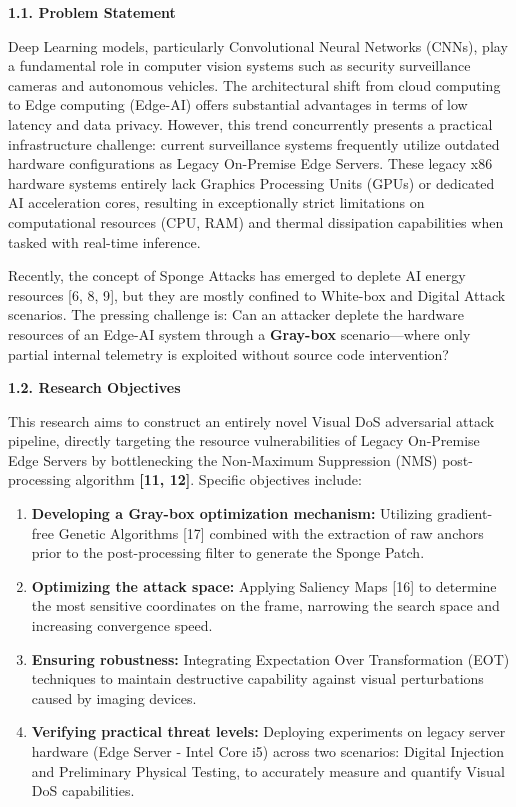 \documentclass[]{article}
\begin{document}
\textbf{1.1. Problem Statement}

Deep Learning models, particularly Convolutional Neural Networks (CNNs), play a fundamental role in computer vision systems such as security surveillance cameras and autonomous vehicles. The architectural shift from cloud computing to Edge computing (Edge-AI) offers substantial advantages in terms of low latency and data privacy. However, this trend concurrently presents a practical infrastructure challenge: current surveillance systems frequently utilize outdated hardware configurations as Legacy On-Premise Edge Servers. These legacy x86 hardware systems entirely lack Graphics Processing Units (GPUs) or dedicated AI acceleration cores, resulting in exceptionally strict limitations on computational resources (CPU, RAM) and thermal dissipation capabilities when tasked with real-time inference.

Recently, the concept of Sponge Attacks has emerged to deplete AI energy resources {[}6, 8, 9{]}, but they are mostly confined to White-box and Digital Attack scenarios. The pressing challenge is: Can an attacker deplete the hardware resources of an Edge-AI system through a \textbf{Gray-box} scenario---where only partial internal telemetry is exploited without source code intervention?

\textbf{1.2. Research Objectives}

This research aims to construct an entirely novel Visual DoS adversarial attack pipeline, directly targeting the resource vulnerabilities of Legacy On-Premise Edge Servers by bottlenecking the Non-Maximum Suppression (NMS) post-processing algorithm \textbf{{[}11, 12{]}}. Specific objectives include:

\begin{enumerate}
\def\labelenumi{\arabic{enumi}.}
\item
  \textbf{Developing a Gray-box optimization mechanism:} Utilizing gradient-free Genetic Algorithms {[}17{]} combined with the extraction of raw anchors prior to the post-processing filter to generate the Sponge Patch.
\item
  \textbf{Optimizing the attack space:} Applying Saliency Maps {[}16{]} to determine the most sensitive coordinates on the frame, narrowing the search space and increasing convergence speed.
\item
  \textbf{Ensuring robustness:} Integrating Expectation Over Transformation (EOT) techniques to maintain destructive capability against visual perturbations caused by imaging devices.
\item
  \textbf{Verifying practical threat levels:} Deploying experiments on legacy server hardware (Edge Server - Intel Core i5) across two scenarios: Digital Injection and Preliminary Physical Testing, to accurately measure and quantify Visual DoS capabilities.
\end{enumerate}
\end{document}
